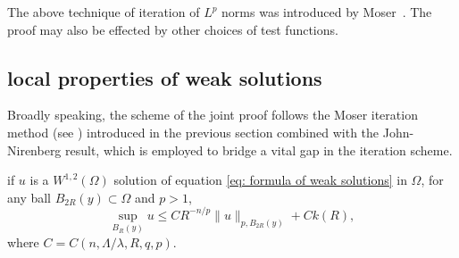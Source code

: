 The above technique of iteration of $L^p$ norms was introduced by Moser~\cite{Moser1960}.
The proof may also be effected by other choices of test functions.

\subsection{local properties of weak solutions}

Broadly speaking, the scheme of the joint proof follows the Moser iteration method (see \cite{Moser1961}) introduced in the previous section combined with the John-Nirenberg result, which is employed to bridge a vital gap in the iteration scheme.

\begin{lemma}
	if $u$ is a $W^{1,2}(\Omega)$ solution of equation \eqref{eq: formula of weak solutions} in $\Omega$,
	for any ball $B_{2R}(y)\subset\Omega$ and $p>1$,
	\[
		\sup_{B_R(y)} u \leq CR^{-n/p}\|u\|_{p, B_{2R}(y)} + Ck(R),
	\]
	where $C=C(n, \Lambda/\lambda, R, q, p)$.
\end{lemma}
